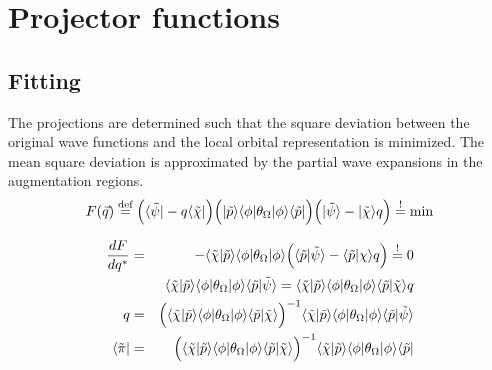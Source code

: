 \documentclass[11pt,a4paper]{report}
\begin{document}
\section{Projector functions}
\subsection{Fitting}
The projections are determined such that the square deviation between
the original wave functions and the local orbital representation is
minimized. The mean square deviation is approximated by the partial
wave expansions in the augmentation regions.
\begin{eqnarray}
F(\vec{q})\stackrel{\text{def}}{=} \Bigl(\langle\tilde{\psi}|-q\langle\tilde{\chi}|\Bigr)
\Bigl(|\tilde{p}\rangle\langle\phi|\theta_\Omega|\phi\rangle\langle\tilde{p}|\Bigr)
\Bigl(|\tilde{\psi}\rangle-|\tilde{\chi}\rangle q\Bigr)\stackrel{!}{=}\text{min}
\end{eqnarray}

\begin{eqnarray}
\frac{dF}{dq^*}&=&-\langle\tilde{\chi}|\tilde{p}\rangle
\langle\phi|\theta_\Omega|\phi\rangle
\Bigl(
\langle\tilde{p}|\tilde{\psi}\rangle-\langle\tilde{p}|\chi\rangle q\Bigr)
\stackrel{!}{=}0
\nonumber\\
%
%
%
&&\langle\tilde{\chi}|\tilde{p}\rangle
\langle\phi|\theta_\Omega|\phi\rangle
\langle\tilde{p}|\tilde{\psi}\rangle
=
\langle\tilde{\chi}|\tilde{p}\rangle
\langle\phi|\theta_\Omega|\phi\rangle
\langle\tilde{p}|\tilde\chi\rangle q
\nonumber\\
%
%
%
q&=&\Bigl(\langle\tilde{\chi}|\tilde{p}\rangle
\langle\phi|\theta_\Omega|\phi\rangle
\langle\tilde{p}|\tilde{\chi}\rangle\Bigr)^{-1}
\langle\tilde{\chi}|\tilde{p}\rangle
\langle\phi|\theta_\Omega|\phi\rangle
\langle\tilde{p}|\tilde{\psi}\rangle
\nonumber\\
%
%
%
\langle\tilde{\pi}|&=&
\Bigl(\langle\tilde{\chi}|\tilde{p}\rangle
\langle\phi|\theta_\Omega|\phi\rangle
\langle\tilde{p}|\tilde{\chi}\rangle\Bigr)^{-1}
\langle\tilde{\chi}|\tilde{p}\rangle
\langle\phi|\theta_\Omega|\phi\rangle
\langle\tilde{p}|
\label{eq:orbitalprojector}
\end{eqnarray}


\end{document}

